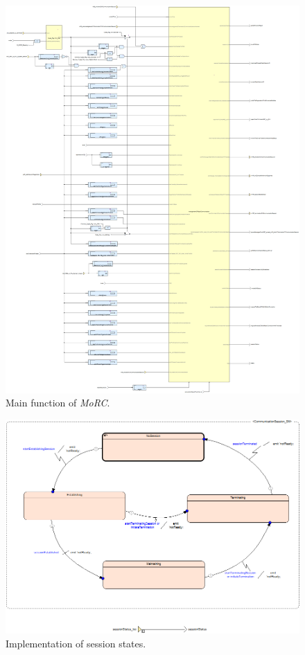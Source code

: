 \begin{figure}
\centering
\includegraphics[scale=0.2]{../images/MoRC_Main.png}
\caption{Main function of \textit{MoRC}.}
\end{figure}

\begin{figure}
\centering
\includegraphics[width=\textwidth]{../images/MoRC_SessionManagement.png}
\caption{Implementation of session states.}
\end{figure}


